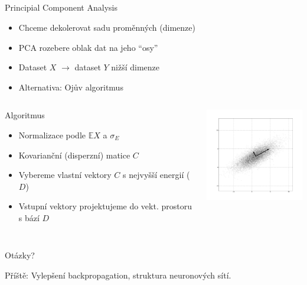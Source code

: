 \documentclass{beamer}
\begin{document}
\subsection{}
\begin{frame}{Principial Component Analysis}
\begin{itemize}
\item Chceme dekolerovat sadu proměnných (dimenze)
\item PCA rozebere oblak dat na jeho ``osy''
\item Dataset $X$ $\to$ dataset $Y$ nižší dimenze
\item Alternativa: Ojův algoritmus
\end{itemize}

\begin{columns}
\begin{column}{6cm}
\begin{block}{Algoritmus}
\begin{itemize}
\item Normalizace podle $\mathbb{E}X$ a $\sigma_E$
\item Kovarianční (disperzní) matice $C$
\item Vybereme vlastní vektory $C$ s nejvyšší energií ($D$)
\item Vstupní vektory projektujeme do vekt. prostoru s bází $D$
\end{itemize}
\end{block}
\end{column}
\begin{column}{5cm}
\includegraphics[width=5cm]{GaussianScatterPCA.png}
\end{column}
\end{columns}
\end{frame}

\subsection{}
\begin{frame}{Otázky?}
\begin{center}
Příště: Vylepšení backpropagation, struktura neuronových sítí.
\end{center}
\end{frame}
\end{document}
